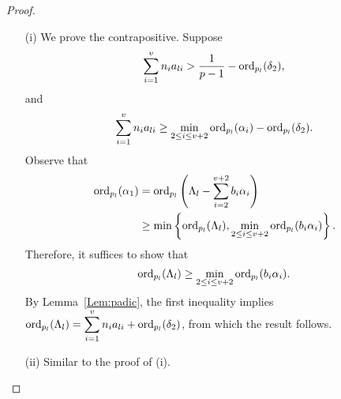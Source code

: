 \begin{proof} \
\begin{enumerate}
\item[(i)] We prove the contrapositive. Suppose
\[\sum_{i = 1}^v n_i a_{li} > \frac{1}{p-1} - \operatorname{ord}_{p_l}(\delta_2), \]
and
\[\sum_{i = 1}^v n_i a_{li}  \geq \displaystyle \min_{2 \leq i \leq v+2} \operatorname{ord}_{p_l}(\alpha_{i}) - \operatorname{ord}_{p_l}(\delta_2).\]
Observe that
\[\begin{split}
\operatorname{ord}_{p_l}(\alpha_{1}) 	
	& = \operatorname{ord}_{p_l}\left( \Lambda_{l} - \sum_{i = 2}^{v+2}b_i\alpha_{i}\right) \\
	& \geq \min\left\{ \operatorname{ord}_{p_l}(\Lambda_{l}), \min_{2 \leq i \leq v+2} \operatorname{ord}_{p_l}(b_i\alpha_{i})\right\}.
\end{split}\]
Therefore, it suffices to show that 
\[\operatorname{ord}_{p_l}(\Lambda_{l}) \geq \min_{2 \leq i \leq v+2} \operatorname{ord}_{p_l}(b_i\alpha_{i}).\]
By Lemma~\ref{Lem:padic}, the first inequality implies $\operatorname{ord}_{p_l}(\Lambda_{l}) = \displaystyle \sum_{i = 1}^v n_ia_{li} + \operatorname{ord}_{p_l}(\delta_2)$, from which the result follows. 

\item[(ii)] Similar to the proof of (i).
\end{enumerate}
\end{proof}



